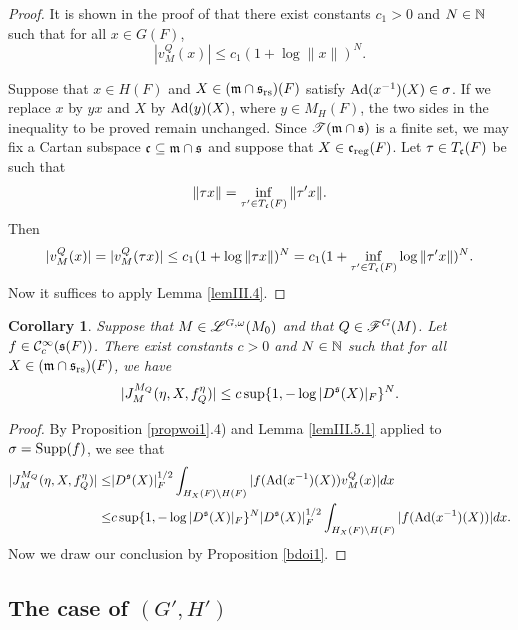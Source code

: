 \documentclass[a4paper]{amsart}
\newcommand{\fm}{{\mathfrak{m}}} \newcommand{\fn}{{\mathfrak{n}}}\newcommand{\fo}{{\mathfrak{o}}} \newcommand{\fp}{{\mathfrak{p}}}
\newtheorem{coro}[thm]{Corollary}
\theoremstyle{definition}
\theoremstyle{remark}
\numberwithin{equation}{subsection}
\begin{document}
\begin{proof}
It is shown in the proof of \cite[Lemme III.5]{MR1344131} that there exist constants $c_1>0$ and $N\in{\mathbb {N}}$ such that for all $x\in G(F)$, 
$$ |v_M^Q(x)|\leq c_1(1+\log \|x\|)^N. $$

Suppose that $x\in H(F)$ and $X\in(\fm\cap\fs_\rs)(F)$ satisfy ${\mathrm{Ad}}(x^{-1})(X)\in\sigma$. If we replace $x$ by $yx$ and $X$ by ${\mathrm{Ad}}(y)(X)$, where $y\in M_H(F)$, the two sides in the inequality to be proved remain unchanged. Since $\mst(\fm\cap\fs)$ is a finite set, we may fix a Cartan subspace $\fc\subseteq\fm\cap\fs$ and suppose that $X\in{\mathfrak{c}}_{\mathrm{reg}}(F)$. Let $\tau\in T_{\mathfrak{c}}(F)$ be such that
$$ \|\tau x\|=\inf_{\tau'\in T_{\mathfrak{c}}(F)} \|\tau' x\|. $$
Then
$$ |v_M^Q(x)|= |v_M^Q(\tau x)|\leq c_1(1+\log \|\tau x\|)^N=c_1(1+\inf_{\tau'\in T_{\mathfrak{c}}(F)}\log\|\tau' x\|)^N. $$
Now it suffices to apply Lemma \ref{lemIII.4}. 
\end{proof}

\begin{coro}\label{corIII.6.1}
Suppose that $M\in\mathscr{L}^{G,\omega}(M_0)$ and that $Q\in\mathscr{F}^G(M)$. Let $f\in{\mathcal {C}}_c^\infty({\mathfrak{s}}(F))$. There exist constants $c>0$ and $N\in{\mathbb {N}}$ such that for all $X\in(\fm\cap\fs_\rs)(F)$, we have
$$ |J_M^{M_Q}(\eta, X, f_Q^\eta)| \leq c \sup\{1, -\log |D^{\mathfrak{s}}(X)|_F\}^N. $$
\end{coro}

\begin{proof}
By Proposition \ref{propwoi1}.4) and Lemma \ref{lemIII.5.1} applied to $\sigma={\mathrm{Supp}}(f)$, we see that
\[\begin{split}
|J_M^{M_Q}(\eta, X, f_Q^\eta)|\leq&|D^{\mathfrak{s}}(X)|_F^{1/2} \int_{H_X(F)\backslash H(F)} |f({\mathrm{Ad}}(x^{-1})(X)) v_M^Q(x)| dx \\
\leq&c\sup\{1, -\log |D^{\mathfrak{s}}(X)|_F\}^N |D^{\mathfrak{s}}(X)|_F^{1/2} \int_{H_X(F)\backslash H(F)} |f({\mathrm{Ad}}(x^{-1})(X))| dx. 
\end{split}\]
Now we draw our conclusion by Proposition \ref{bdoi1}. 
\end{proof}

\subsection{The case of $(G',H')$}
\end{document}
